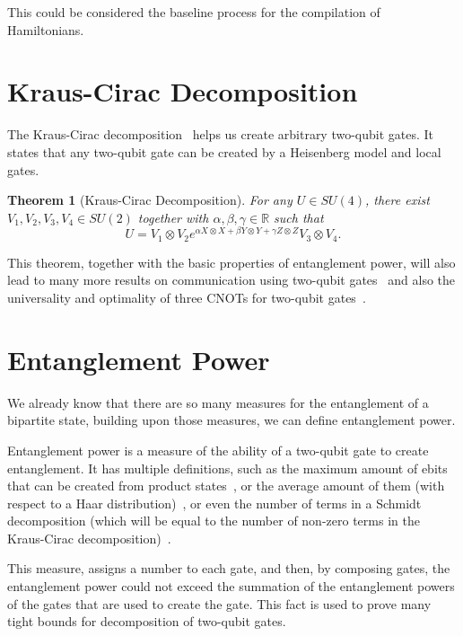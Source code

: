 \documentclass{report}
\newtheorem{theorem}{Theorem}
\begin{document}
This could be considered the baseline process for the compilation of Hamiltonians.

\section{Kraus-Cirac Decomposition}

The Kraus-Cirac decomposition~\cite{kraus2001} helps us create arbitrary two-qubit gates. It states that any two-qubit gate can be created by a Heisenberg model and local gates.

\begin{theorem}[Kraus-Cirac Decomposition]
For any $U \in SU(4)$, there exist $V_1, V_2, V_3, V_4 \in SU(2)$ together with $\alpha, \beta, \gamma \in \mathbb{R}$ such that
\begin{equation}
  U = V_1 \otimes V_2 e^{\alpha X\otimes X + \beta Y\otimes Y + \gamma Z\otimes Z} V_3 \otimes V_4.
  \end{equation}
\end{theorem}

This theorem, together with the basic properties of entanglement power, will also lead to many more results on communication using two-qubit gates~\cite{berry2002} and also the universality and optimality of three CNOTs for two-qubit gates~\cite{vatan2004}.

\section{Entanglement Power}

We already know that there are so many measures for the entanglement of a bipartite state, building upon those measures, we can define entanglement power.

Entanglement power is a measure of the ability of a two-qubit gate to create entanglement. It has multiple definitions, such as the maximum amount of ebits that can be created from product states~\cite{shen2018}, or the average amount of them (with respect to a Haar distribution)~\cite{zanardi2000}, or even the number of terms in a Schmidt decomposition (which will be equal to the number of non-zero terms in the Kraus-Cirac decomposition)~\cite{nielsen2003}.

This measure, assigns a number to each gate, and then, by composing gates, the entanglement power could not exceed the summation of the entanglement powers of the gates that are used to create the gate. This fact is used to prove many tight bounds for decomposition of two-qubit gates.
\end{document}
